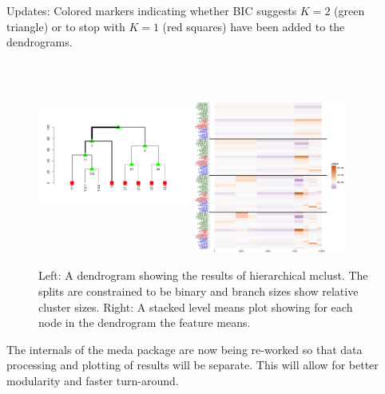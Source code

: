 \documentclass[simplex.tex]{subfiles}
\begin{document}

Updates:  Colored markers indicating whether BIC suggests $K = 2$ (green
triangle)  or to stop with $K = 1$ (red squares) have been added to the
dendrograms. 

\begin{figure}[!h]
\begin{cframed}
\centering
\includegraphics[width=0.45\textwidth, height = 2.5in, clip = true, trim = 0 -4cm 0 0]{../../figs/meda_dend_201703.png}
\includegraphics[width=0.45\textwidth, clip = true, trim = 1cm 0 5mm 1mm]{../../figs/meda_stacked_201703.png}
\caption{Left:  A dendrogram showing the results of hierarchical mclust.
The splits are constrained to be binary and branch sizes show relative
cluster sizes.  Right: A stacked level means plot showing for each node
in the dendrogram the feature means.}
\label{fig:meda201702}
\end{cframed}
\end{figure}

The internals of the meda package are now being re-worked so that data
processing and plotting of results will be separate. This will allow for
better modularity and faster turn-around. 

\clearpage
\end{document}
